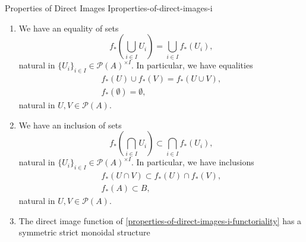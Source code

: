 \begin{proposition}{Properties of Direct Images I}{properties-of-direct-images-i}
\begin{enumerate}
\begin{enumerate}
\begin{enumerate}
                        \item We have $f_{*}(U)\subset V$.
                        \item We have $U\subset f^{-1}(V)$.
                    \end{enumerate}%
                \item The following conditions are equivalent:
                    \begin{enumerate}%
                        \item We have $f^{-1}(U)\subset V$.
                        \item We have $U\subset f_{!}(V)$.
                    \end{enumerate}%
            \end{enumerate}%
        \item\label{properties-of-direct-images-i-preservation-of-colimits}We have an equality of sets
            \[
                f_{*}(\bigcup_{i\in I}U_{i})%
                =%
                \bigcup_{i\in I}f_{*}(U_{i}),%
            \]%
            natural in $\{U_{i}\}_{i\in I}\in\mathcal{P}(A)^{\times I}$. In particular, we have equalities%
            \[
                \begin{gathered}
                    f_{*}(U)\cup f_{*}(V)                  = f_{*}(U\cup V),\\
                    f_{*}(\emptyset)                       = \emptyset,
                \end{gathered}
            \]%
            natural in $U,V\in\mathcal{P}(A)$.
        \item\label{properties-of-direct-images-i-oplax-preservation-of-limits}We have an inclusion of sets
            \[
                f_{*}(\bigcap_{i\in I}U_{i})%
                \subset%
                \bigcap_{i\in I}f_{*}(U_{i}),%
            \]%
            natural in $\{U_{i}\}_{i\in I}\in\mathcal{P}(A)^{\times I}$. In particular, we have inclusions%
            \[
                \begin{gathered}
                    f_{*}(U\cap V) \subset f_{*}(U)\cap f_{*}(V),\\
                    f_{*}(A)        \subset B,
                \end{gathered}
            \]%
            natural in $U,V\in\mathcal{P}(A)$.
        \item\label{properties-of-direct-images-i-symmetric-strict-monoidality-with-respect-to-unions}The direct image function of \cref{properties-of-direct-images-i-functoriality} has a symmetric strict monoidal structure

\end{enumerate}
\end{proposition}
